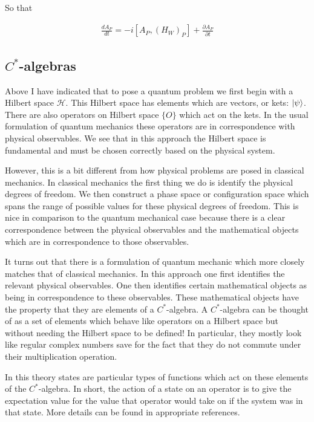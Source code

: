 \documentclass[12pt]{article}
\newcommand{\ddt}[1]{\frac{d #1}{dt}}
\newcommand{\ppt}[1]{\frac{\partial #1}{\partial t}}
\begin{document}
So that

\begin{align}
\ddt{A_P} = -i[A_P,(H_W)_P] + \ppt{A_P}
\end{align}

\subsection{$C^*$-algebras}

Above I have indicated that to pose a quantum problem we first begin with a Hilbert space $\mathcal{H}$. This Hilbert space has elements which are vectors, or kets: $\ket{\psi}$. There are also operators on Hilbert space $\{O\}$ which act on the kets. In the usual formulation of quantum mechanics these operators are in correspondence with physical observables. We see that in this approach the Hilbert space is fundamental and must be chosen correctly based on the physical system.

However, this is a bit different from how physical problems are posed in classical mechanics. In classical mechanics the first thing we do is identify the physical degrees of freedom. We then construct a phase space or configuration space which spans the range of possible values for these physical degrees of freedom. This is nice in comparison to the quantum mechanical case because there is a clear correspondence between the physical observables and the mathematical objects which are in correspondence to those observables.

It turns out that there is a formulation of quantum mechanic which more closely matches that of classical mechanics. In this approach one first identifies the relevant physical observables. One then identifies certain mathematical objects as being in correspondence to these observables. These mathematical objects have the property that they are elements of a $C^*$-algebra. A $C^*$-algebra can be thought of as a set of elements which behave like operators on a Hilbert space but without needing the Hilbert space to be defined! In particular, they mostly look like regular complex numbers save for the fact that they do not commute under their multiplication operation. 

In this theory states are particular types of functions which act on these elements of the $C^*$-algebra. In short, the action of a state on an operator is to give the expectation value for the value that operator would take on if the system was in that state. More details can be found in appropriate references.
\end{document}
